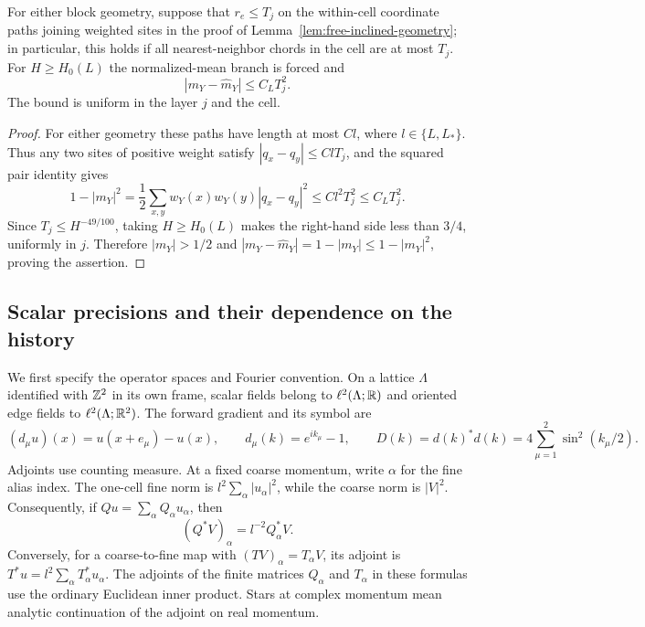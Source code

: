 \begin{corollary}
\label{cor:free-small-chord-mean}
For either block geometry, suppose that $r_e\le T_j$ on the within-cell
coordinate paths joining weighted sites in the proof of
Lemma~\ref{lem:free-inclined-geometry}; in particular, this holds if all
nearest-neighbor chords in the cell are at most $T_j$.
For $H\ge H_0(L)$ the normalized-mean branch is forced and
\[
 |m_Y-\widehat m_Y|\le C_L T_j^2.
\]
The bound is uniform in the layer $j$ and the cell.
\end{corollary}

\begin{proof}
For either geometry these paths have length at most $Cl$, where
$l\in\{L,L_*\}$.  Thus any two sites of positive weight satisfy
$|q_x-q_y|\le ClT_j$, and the squared pair identity gives
\[
 1-|m_Y|^2
 =\frac12\sum_{x,y}w_Y(x)w_Y(y)|q_x-q_y|^2
 \le C l^2T_j^2\le C_L T_j^2.
\]
Since $T_j\le H^{-49/100}$, taking $H\ge H_0(L)$ makes the right-hand
side less than $3/4$, uniformly in $j$.  Therefore $|m_Y|>1/2$ and
$|m_Y-\widehat m_Y|=1-|m_Y|\le1-|m_Y|^2$, proving the assertion.
\end{proof}

\subsection{Scalar precisions and their dependence on the history}

We first specify the operator spaces and Fourier convention.  On a
lattice $\Lambda$ identified with $\mathbb Z^2$ in its own frame, scalar fields
belong to $\ell^2(\Lambda;\mathbb R)$ and oriented edge fields to
$\ell^2(\Lambda;\mathbb R^2)$.  The forward gradient and its symbol are
\[
 (d_\mu u)(x)=u(x+e_\mu)-u(x),\qquad
 d_\mu(k)=e^{ik_\mu}-1,
 \qquad D(k)=d(k)^*d(k)=4\sum_{\mu=1}^2\sin^2(k_\mu/2).
\]
Adjoints use counting measure.  At a fixed coarse momentum, write
$\alpha$ for the fine alias index.  The one-cell fine norm is
$l^2\sum_\alpha|u_\alpha|^2$, while the coarse norm is $|V|^2$.
Consequently, if $Qu=\sum_\alpha Q_\alpha u_\alpha$, then
\[
 (Q^*V)_\alpha=l^{-2}Q_\alpha^*V.
\]
Conversely, for a coarse-to-fine map with $(TV)_\alpha=T_\alpha V$,
its adjoint is $T^*u=l^2\sum_\alpha T_\alpha^*u_\alpha$.
The adjoints of the finite matrices $Q_\alpha$ and $T_\alpha$ in these
formulas use the ordinary Euclidean inner product.  Stars at complex
momentum mean analytic continuation of the adjoint on real momentum.

